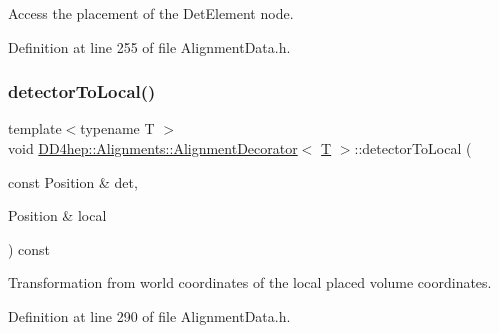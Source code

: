 Access the placement of the Det\+Element node. 



Definition at line 255 of file Alignment\+Data.\+h.

\hypertarget{class_d_d4hep_1_1_alignments_1_1_alignment_decorator_a0448f46243dcf50434e1b44b15a2d5bc}{}\label{class_d_d4hep_1_1_alignments_1_1_alignment_decorator_a0448f46243dcf50434e1b44b15a2d5bc} 
\subsubsection{\texorpdfstring{detector\+To\+Local()}{detectorToLocal()}\hspace{0.1cm}{\footnotesize\ttfamily [1/2]}}
{\footnotesize\ttfamily template$<$typename T $>$ \\
void \hyperlink{class_d_d4hep_1_1_alignments_1_1_alignment_decorator}{D\+D4hep\+::\+Alignments\+::\+Alignment\+Decorator}$<$ \hyperlink{class_t}{T} $>$\+::detector\+To\+Local (\begin{DoxyParamCaption}\item[{const Position \&}]{det,  }\item[{Position \&}]{local }\end{DoxyParamCaption}) const\hspace{0.3cm}{\ttfamily [inline]}}



Transformation from world coordinates of the local placed volume coordinates. 



Definition at line 290 of file Alignment\+Data.\+h.

\hypertarget{class_d_d4hep_1_1_alignments_1_1_alignment_decorator_adf3febc4006482275c8e322a0abb8a3a}{}\label{class_d_d4hep_1_1_alignments_1_1_alignment_decorator_adf3febc4006482275c8e322a0abb8a3a} 
